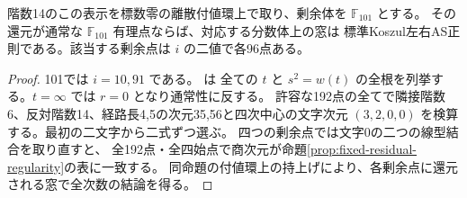 \begin{proposition}\label{prop:rank-fourteen-residue}
階数14のこの表示を標数零の離散付値環上で取り、剰余体を $\mathbb F_{101}$ とする。
その還元が通常な $\mathbb F_{101}$ 有理点ならば、対応する分数体上の窓は
標準Koszul左右AS正則である。該当する剰余点は $i$ の二値で各96点ある。
\end{proposition}
\begin{proof}
101では $i=10,91$ である。 は
全ての $t$ と $s^2=w(t)$ の全根を列挙する。$t=\infty$ では $r=0$ となり通常性に反する。
許容な192点の全てで隣接階数6、反対階数14、経路長4,5の次元35,56と四次中心の文字次元
$(3,2,0,0)$ を検算する。最初の二文字から二式ずつ選ぶ。
四つの剰余点では文字0の二つの線型結合を取り直すと、
全192点・全四始点で商次元が命題\ref{prop:fixed-residual-regularity}の表に一致する。
同命題の付値環上の持上げにより、各剰余点に還元される窓で全次数の結論を得る。
\end{proof}
